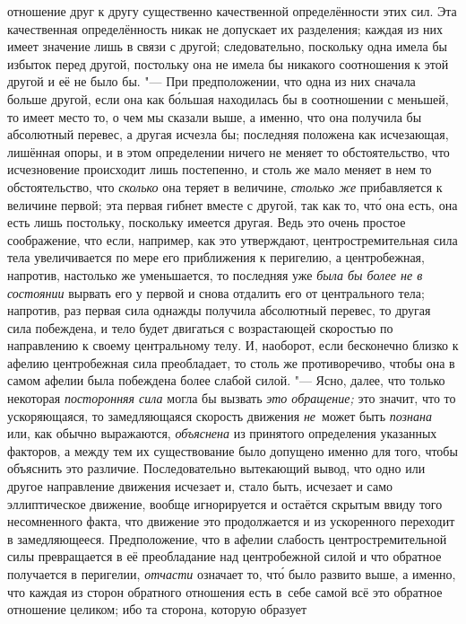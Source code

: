 отношение друг к другу существенно качественной определённости этих сил. Эта
качественная определённость никак не допускает их разделения; каждая из них
имеет значение лишь в связи с другой; следовательно, поскольку одна имела бы
избыток перед другой, постольку она не имела бы никакого соотношения к этой
другой и её не было бы. "--- При предположении, что одна из них сначала больше
другой, если она как б\'{о}льшая находилась бы в соотношении с меньшей, то
имеет место то, о чем мы сказали выше, а именно, что она получила бы абсолютный
перевес, а другая исчезла бы; последняя положена как исчезающая, лишённая
опоры, и в этом определении ничего не меняет то обстоятельство, что
исчезновение происходит лишь постепенно, и столь же мало меняет в нем то
обстоятельство, что {\em сколько} она теряет в величине, {\em столько же}
прибавляется к величине первой; эта первая гибнет вместе с другой, так как то,
чт\'{о} она есть, она есть лишь постольку, поскольку имеется другая. Ведь это
очень простое соображение, что если, например, как это утверждают,
центростремительная сила тела увеличивается по мере его приближения к
перигелию, а центробежная, напротив, настолько же уменьшается, то последняя уже
{\em была бы более не в состоянии} вырвать его у первой и снова отдалить его от
центрального тела; напротив, раз первая сила однажды получила абсолютный
перевес, то другая сила побеждена, и тело будет двигаться с возрастающей
скоростью по направлению к своему центральному телу. И, наоборот, если
бесконечно близко к афелию центробежная сила преобладает, то столь же
противоречиво, чтобы она в самом афелии была побеждена более слабой силой. "---
Ясно, далее, что только некоторая {\em посторонняя сила} могла бы вызвать
{\em это обращение;} это значит, что то ускоряющаяся, то замедляющаяся
скорость движения {\em не}~может быть {\em познана} или, как обычно выражаются,
{\em объяснена} из принятого определения
указанных факторов, а между тем их существование было
допущено именно для того, чтобы объяснить это различие. Последовательно
вытекающий вывод, что одно или другое направление движения исчезает и, стало
быть, исчезает и само эллиптическое движение, вообще игнорируется и остаётся
скрытым ввиду того несомненного факта, что движение это продолжается и из
ускоренного переходит в замедляющееся. Предположение, что в афелии слабость
центростремительной силы превращается в её преобладание над центробежной силой
и что обратное получается в перигелии, {\em отчасти} означает то, чт\'{о} было
развито выше, а именно, что каждая из сторон обратного отношения есть в~себе
самой всё это обратное отношение целиком; ибо та сторона, которую образует

